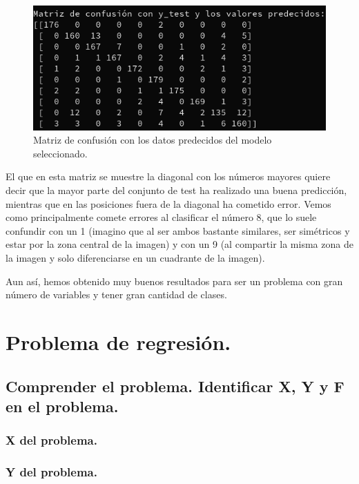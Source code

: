 \documentclass[12pt, spanish]{article}
\begin{document}
\begin{figure}[H]
	\centering
	\includegraphics[scale=0.45]{clasificacion/matrizC.png}
	\caption{Matriz de confusión con los datos predecidos del modelo seleccionado.}
	\label{MC}
\end{figure}

El que en esta matriz se muestre la diagonal con los números mayores quiere decir que la mayor parte del conjunto de test ha realizado una buena predicción, mientras que en las posiciones  fuera de la diagonal ha cometido error. Vemos como principalmente comete errores al clasificar el número 8, que lo suele confundir con un 1 (imagino que al ser ambos bastante similares, ser simétricos y estar por la zona central de la imagen) y con un 9 (al compartir la misma zona de la imagen y solo diferenciarse en un cuadrante de la imagen).

Aun así, hemos obtenido muy buenos resultados para ser un problema con gran número de variables y tener gran cantidad de clases.

\newpage

\section{Problema de regresión.}

\subsection{Comprender el problema. Identificar X, Y y F en el problema.}


\subsubsection{X del problema.}


\subsubsection{Y del problema.}
\end{document}
